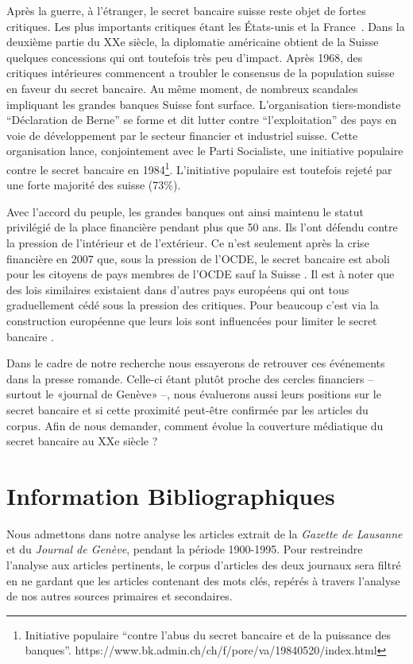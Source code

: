 \documentclass[11pt]{article}
\begin{document}
Après la guerre, à l'étranger, le secret bancaire suisse reste objet de
fortes critiques. Les plus importants critiques étant les États-unis et la
France~\citep[p. 503]{Mazbouri12}. Dans la deuxième partie du XXe siècle, la
diplomatie américaine obtient de la Suisse quelques concessions qui ont
toutefois très peu d'impact. Après 1968, des critiques intérieures commencent a
troubler le consensus de la population suisse en faveur du secret bancaire.
Au même moment, de nombreux scandales impliquant les grandes banques Suisse font 
surface. L’organisation tiers-mondiste “Déclaration de Berne” \citep{EvB} se forme et
dit lutter contre ``l'exploitation'' des pays en voie de développement par le
secteur financier et industriel suisse. Cette organisation lance, conjointement
avec le Parti Socialiste, une initiative populaire contre le secret bancaire en
1984\footnote{Initiative populaire ``contre l'abus du secret bancaire et de la
puissance des banques''.
https://www.bk.admin.ch/ch/f/pore/va/19840520/index.html}. L'initiative
populaire est toutefois rejeté par une forte majorité des suisse (73\%).

Avec l'accord du peuple, les grandes banques ont ainsi maintenu le
statut privilégié de la place financière pendant plus que 50 ans. Ils l’ont
défendu contre la pression de l’intérieur et de l’extérieur. Ce n’est
seulement après la crise financière en 2007 que, sous la pression de l'OCDE,
le secret bancaire est aboli pour les citoyens de pays membres de l'OCDE 
sauf la Suisse \citep{NeufVies}.
Il est à noter que des lois similaires existaient dans d'autres pays européens
qui ont tous graduellement cédé sous la pression des critiques. Pour beaucoup
c'est via la construction européenne que leurs lois sont influencées pour 
limiter le secret bancaire \citep[p. 32]{Palan09}. 

Dans le cadre de notre recherche nous essayerons de retrouver ces événements
dans la presse romande. Celle-ci étant plutôt proche des cercles financiers –
surtout le «journal de Genève» \citep{ConfClass1} –, nous évaluerons aussi
leurs positions sur le secret bancaire et si cette proximité peut-être
confirmée par les articles du corpus. Afin de nous demander, comment évolue la
couverture médiatique du secret bancaire au XXe siècle ? 

\section{Information Bibliographiques}

Nous admettons dans notre analyse les articles extrait de la \textit{Gazette de
Lausanne} et du \textit{Journal de Genève}, pendant la
période 1900-1995. Pour restreindre l’analyse aux articles pertinents, le corpus
d’articles des deux journaux sera filtré en ne gardant que les articles
contenant des mots clés, repérés à travers l’analyse de nos autres sources
primaires et secondaires.
\end{document}
